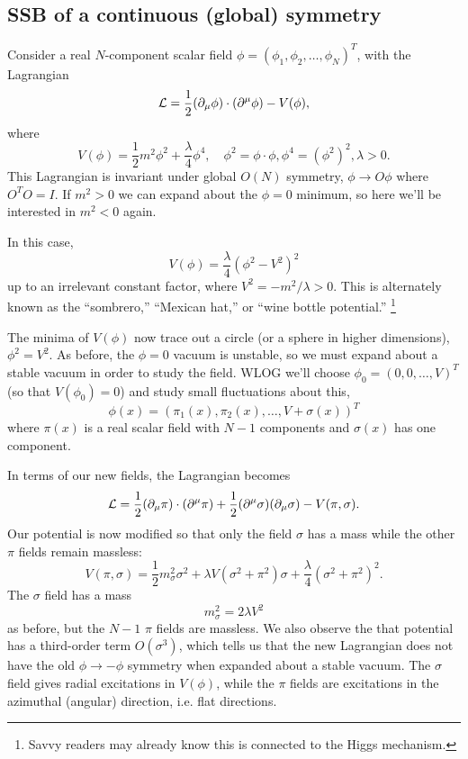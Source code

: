 \subsection*{SSB of a continuous (global) symmetry} Consider a real $N$-component scalar field $\phi=(\phi_1,\phi_2,\ldots,\phi_N)^T$, with the Lagrangian
\begin{equation}
    \mathcal L=\frac{1}{2}(\partial_\mu \phi)\cdot (\partial^\mu \phi)-V(\phi),
\end{equation}
where
\begin{equation}
    V(\phi)=\frac{1}{2}m^2 \phi^2 +\frac{\lambda}{4}\phi^4, \quad \phi^2=\phi \cdot \phi, \phi^4=(\phi^2)^2, \lambda >0.
\end{equation}
This Lagrangian is invariant under global $O(N)$ symmetry, $\phi \to O \phi$ where $O^TO=I$. If $m^2>0$ we can expand about the $\phi=0$ minimum, so here we'll be interested in $m^2<0$ again.

In this case,
\begin{equation}
    V(\phi)=\frac{\lambda}{4}(\phi^2-V^2)^2
\end{equation}
up to an irrelevant constant factor, where $V^2=-m^2/\lambda >0$. This is alternately known as the ``sombrero,'' ``Mexican hat,'' or ``wine bottle potential.''%
    \footnote{Savvy readers may already know this is connected to the Higgs mechanism.}
    
The minima of $V(\phi)$ now trace out a circle (or a sphere in higher dimensions), $\phi^2=V^2$. As before, the $\phi=0$ vacuum is unstable, so we must expand about a stable vacuum in order to study the field. WLOG we'll choose $\phi_0=(0,0,\ldots,V)^T$ (so that $V(\phi_0)=0$) and study small fluctuations about this,
\begin{equation}
    \phi(x)=(\pi_1(x),\pi_2(x),\ldots,V+\sigma(x))^T
\end{equation}
where $\pi(x)$ is a real scalar field with $N-1$ components and $\sigma(x)$ has one component.

In terms of our new fields, the Lagrangian becomes
\begin{equation}
    \mathcal L = \frac{1}{2} (\partial_\mu \pi)\cdot (\partial^\mu \pi)+\frac{1}{2}(\partial^\mu\sigma)(\partial_\mu \sigma)-V(\pi,\sigma).
\end{equation}
Our potential is now modified so that only the field $\sigma$ has a mass while the other $\pi$ fields remain massless:
\begin{equation}
    V(\pi,\sigma)=\frac{1}{2} m_\sigma^2 \sigma^2 + \lambda V(\sigma^2 +\pi^2)\sigma +\frac{\lambda}{4}(\sigma^2+\pi^2)^2.
\end{equation}
The $\sigma$ field has a mass
\begin{equation*}
    m_\sigma^2 =2\lambda V^2
\end{equation*}
as before, but the $N-1$ $\pi$ fields are massless. We also observe the that potential has a third-order term $O(\sigma^3)$, which tells us that the new Lagrangian does not have the old $\phi\to-\phi$ symmetry when expanded about a stable vacuum. The $\sigma$ field gives radial excitations in $V(\phi)$, while the $\pi$ fields are excitations in the azimuthal (angular) direction, i.e. flat directions.


